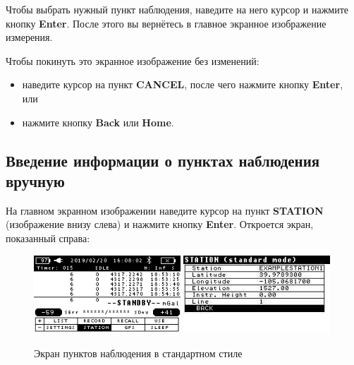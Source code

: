 Чтобы выбрать нужный пункт наблюдения, наведите на него курсор и нажмите кнопку
\textbf{Enter}. После этого вы вернётесь в главное экранное изображение
измерения.

Чтобы покинуть это экранное изображение без изменений:
\begin{itemize}
  \item наведите курсор на пункт \textbf{CANCEL}, после чего нажмите кнопку
    \textbf{Enter}, или

  \item нажмите кнопку \textbf{Back} или \textbf{Home}.
\end{itemize}



\subsection[Введение информации о пунктах вручную]{Введение информации о пунктах наблюдения вручную}

На главном экранном изображении наведите курсор на пункт \textbf{STATION}
(изображение внизу слева) и нажмите кнопку \textbf{Enter}. Откроется экран,
показанный справа:

\begin{figure}[h]
  \centering
  \includegraphics[width=0.49\textwidth]{figures/station_screen_under_standard_station_style_1}
  \includegraphics[width=0.49\textwidth]{figures/station_screen_under_standard_station_style_2}
  \caption{Экран пунктов наблюдения в стандартном стиле}
  \label{fig:station_screen_under_standard_station_style}
\end{figure}

